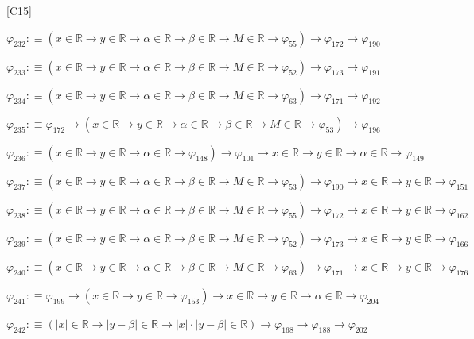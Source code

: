 \begin{fullproof}{[C15]}
\begin{abbrevlist}
\item $\varphi_{232} :\equiv (x \in \mathbb{R} \to y \in \mathbb{R} \to \alpha \in \mathbb{R} \to \beta \in \mathbb{R} \to M \in \mathbb{R} \to \varphi_{55}) \to \varphi_{172} \to \varphi_{190}$
\item $\varphi_{233} :\equiv (x \in \mathbb{R} \to y \in \mathbb{R} \to \alpha \in \mathbb{R} \to \beta \in \mathbb{R} \to M \in \mathbb{R} \to \varphi_{52}) \to \varphi_{173} \to \varphi_{191}$
\item $\varphi_{234} :\equiv (x \in \mathbb{R} \to y \in \mathbb{R} \to \alpha \in \mathbb{R} \to \beta \in \mathbb{R} \to M \in \mathbb{R} \to \varphi_{63}) \to \varphi_{171} \to \varphi_{192}$
\item $\varphi_{235} :\equiv \varphi_{172} \to (x \in \mathbb{R} \to y \in \mathbb{R} \to \alpha \in \mathbb{R} \to \beta \in \mathbb{R} \to M \in \mathbb{R} \to \varphi_{53}) \to \varphi_{196}$
\item $\varphi_{236} :\equiv (x \in \mathbb{R} \to y \in \mathbb{R} \to \alpha \in \mathbb{R} \to \varphi_{148}) \to \varphi_{101} \to x \in \mathbb{R} \to y \in \mathbb{R} \to \alpha \in \mathbb{R} \to \varphi_{149}$
\item $\varphi_{237} :\equiv (x \in \mathbb{R} \to y \in \mathbb{R} \to \alpha \in \mathbb{R} \to \beta \in \mathbb{R} \to M \in \mathbb{R} \to \varphi_{53}) \to \varphi_{190} \to x \in \mathbb{R} \to y \in \mathbb{R} \to \varphi_{151}$
\item $\varphi_{238} :\equiv (x \in \mathbb{R} \to y \in \mathbb{R} \to \alpha \in \mathbb{R} \to \beta \in \mathbb{R} \to M \in \mathbb{R} \to \varphi_{55}) \to \varphi_{172} \to x \in \mathbb{R} \to y \in \mathbb{R} \to \varphi_{162}$
\item $\varphi_{239} :\equiv (x \in \mathbb{R} \to y \in \mathbb{R} \to \alpha \in \mathbb{R} \to \beta \in \mathbb{R} \to M \in \mathbb{R} \to \varphi_{52}) \to \varphi_{173} \to x \in \mathbb{R} \to y \in \mathbb{R} \to \varphi_{166}$
\item $\varphi_{240} :\equiv (x \in \mathbb{R} \to y \in \mathbb{R} \to \alpha \in \mathbb{R} \to \beta \in \mathbb{R} \to M \in \mathbb{R} \to \varphi_{63}) \to \varphi_{171} \to x \in \mathbb{R} \to y \in \mathbb{R} \to \varphi_{176}$
\item $\varphi_{241} :\equiv \varphi_{199} \to (x \in \mathbb{R} \to y \in \mathbb{R} \to \varphi_{153}) \to x \in \mathbb{R} \to y \in \mathbb{R} \to \alpha \in \mathbb{R} \to \varphi_{204}$
\item $\varphi_{242} :\equiv (\lvert x \rvert \in \mathbb{R} \to \lvert y - \beta \rvert \in \mathbb{R} \to \lvert x \rvert \cdot \lvert y - \beta \rvert \in \mathbb{R}) \to \varphi_{168} \to \varphi_{188} \to \varphi_{202}$

\end{abbrevlist}
\end{fullproof}
